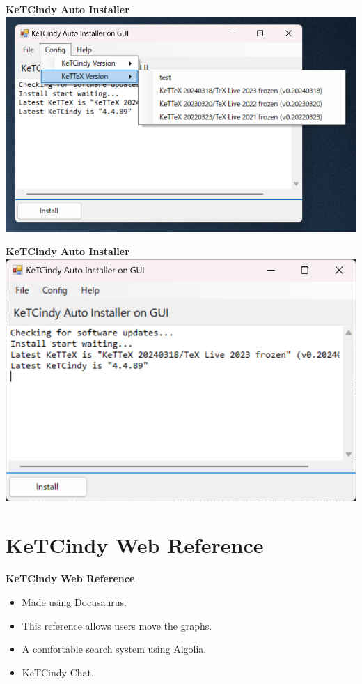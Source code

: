 \documentclass[dvipdfmx, unicode]{beamer}
\begin{document}
\begin{frame}{\bfseries KeTCindy Auto Installer}
  \includegraphics[width=1.0\linewidth]{img/AutoInstaller/installer_1.png}
\end{frame}

\begin{frame}{\bfseries KeTCindy Auto Installer}
  \includegraphics[width=1.0\linewidth]{img/AutoInstaller/installer_2.png}
\end{frame}

\section{KeTCindy Web Reference}

\begin{frame}[t]{\bfseries KeTCindy Web Reference}
  \begin{itemize}
    \item Made using Docusaurus.
    \item This reference allows users move the graphs.
    \item A comfortable search system using Algolia.
    \item KeTCindy Chat.
  \end{itemize}
\end{frame}
\end{document}
